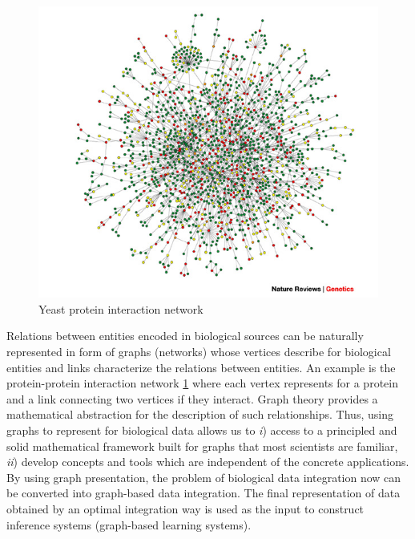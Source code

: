 \begin{figure}
\centering
\includegraphics[width=.9\textwidth]{img/protein_interaction_net}
\caption{Yeast protein interaction network}
\label{fig:protein-interaction-net}
\end{figure}

Relations between entities encoded in biological sources can be naturally represented in form of graphs (networks) whose vertices describe for biological entities and links characterize the relations between entities. An example is the protein-protein interaction network \cref{fig:protein-interaction-net} where each vertex represents for a protein and a link connecting two vertices if they interact. Graph theory provides a mathematical abstraction for the description of such relationships. Thus, using graphs to represent for biological data allows us to \textit{i}) access to a principled and solid mathematical framework built for graphs that most scientists are familiar, \textit{ii}) develop concepts and tools which are independent of the concrete applications. By using graph presentation, the problem of biological data integration now can be converted into graph-based data integration. The final representation of data obtained by an optimal integration way is used as the input to construct inference systems (graph-based learning systems).

